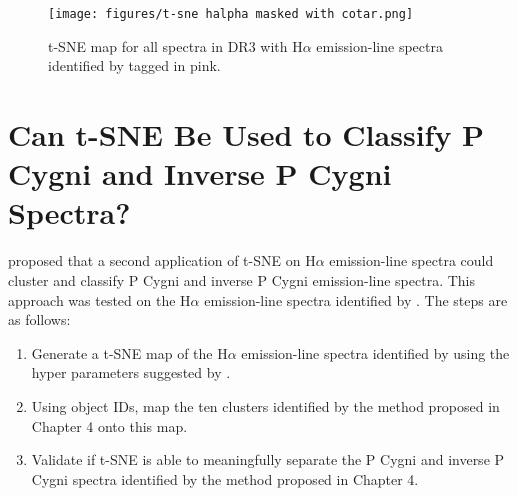 \begin{figure}[!htb]
\centering
\texttt{[image: figures/t-sne halpha masked with cotar.png]}
\caption{t-SNE map for all spectra in DR3 with H$\alpha$ emission-line spectra identified by \citet{vcotar2021galah} tagged in pink.}
\label{fig5.3}
\end{figure}

\section{Can t-SNE Be Used to Classify P Cygni and Inverse P Cygni Spectra?}

\citet{traven2017galah} proposed that a second application of t-SNE on H$\alpha$ emission-line spectra could cluster and classify P Cygni and inverse P Cygni emission-line spectra. This approach was tested on the H$\alpha$ emission-line spectra identified by \citet{vcotar2021galah}. The steps are as follows:

\begin{enumerate}
    \item Generate a t-SNE map of the H$\alpha$ emission-line spectra identified by \citet{vcotar2021galah} using the hyper parameters suggested by \citet{traven2017galah}.
    \item Using object IDs, map the ten clusters identified by the method proposed in Chapter 4 onto this map.
    \item Validate if t-SNE is able to meaningfully separate the P Cygni and inverse P Cygni spectra identified by the method proposed in Chapter 4.
\end{enumerate}

